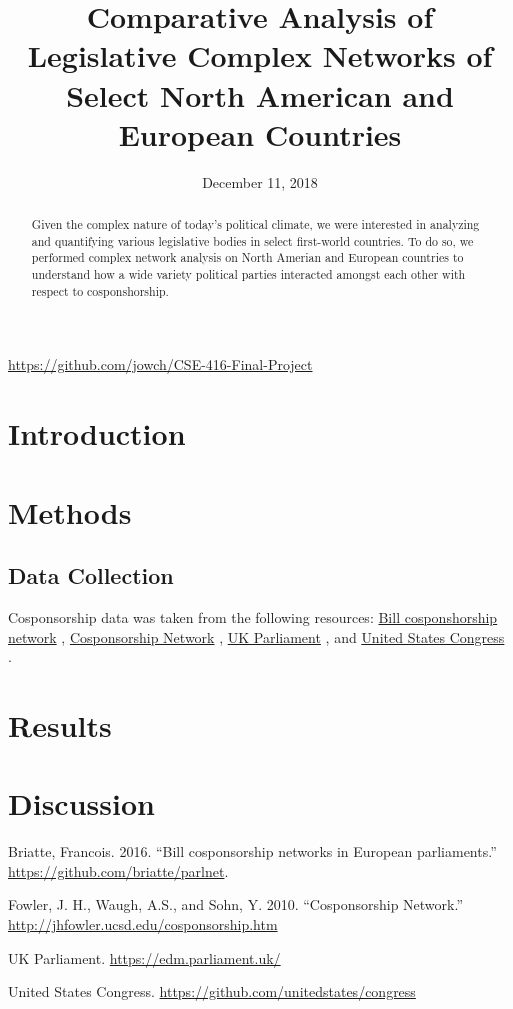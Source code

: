 \documentclass[12pt]{article}
\title{Comparative Analysis of Legislative Complex Networks of Select North American and European Countries}
\author{\names}
\date{December 11, 2018}
\begin{document}
\maketitle
\thispagestyle{empty}

\begin{center}
  \url{https://github.com/jowch/CSE-416-Final-Project}
\end{center}

\begin{abstract}
    Given the complex nature of today's political climate, we were interested in analyzing and quantifying various legislative bodies in select first-world countries. To do so, we performed complex network analysis on North Amerian and European countries to understand how a wide variety political parties interacted amongst each other with respect to cosponshorship. 
\end{abstract}

\section{Introduction}


\section{Methods}
\subsection{Data Collection}
Cosponsorship data was taken from the following resources: \underline{Bill cosponshorship network} \cite{briatte}, \underline{Cosponsorship Network} \cite{fowler}, \underline{UK Parliament} \cite{UK}, and \underline{United States Congress} \cite{US}.

\section{Results}

\section{Discussion}

\newpage
\begin{thebibliography}{9}

 Briatte, Francois. 2016. ``Bill cosponsorship networks in European parliaments.'' \url{https://github.com/briatte/parlnet}.

 Fowler, J. H., Waugh, A.S., and Sohn, Y. 2010. ``Cosponsorship Network.'' \url{http://jhfowler.ucsd.edu/cosponsorship.htm}

 UK Parliament. \url{https://edm.parliament.uk/}

 United States Congress. \url{https://github.com/unitedstates/congress}
\end{thebibliography}
\end{document}
